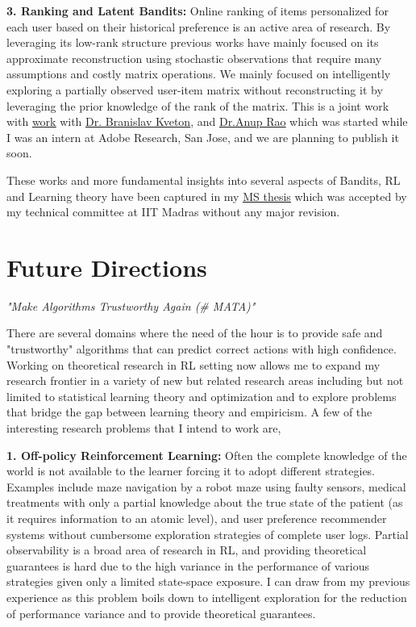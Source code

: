 \documentclass{article}
\begin{document}
\textbf{3. Ranking and Latent Bandits:} Online ranking of items personalized for each user based on their historical preference is an active area of research. By leveraging its low-rank structure previous works have mainly focused on its approximate reconstruction using stochastic observations that require many assumptions and costly matrix operations. We mainly focused on intelligently exploring a partially observed user-item matrix without reconstructing it by leveraging the prior knowledge of the rank of the matrix. This is a joint work with  \href{https://subhojyoti.github.io/pdf/paper.pdf}{\underline{\color{blue} work}} with \href{http://www.bkveton.com/}{\underline{\color{red}Dr. Branislav Kveton}}, and \href{https://sites.google.com/site/anupraob/}{\underline{\color{red}Dr.Anup Rao}} which was started while I was an intern at Adobe Research, San Jose, and we are planning to publish it soon.

These works and more fundamental insights into several aspects of Bandits, RL and Learning theory have been captured in my \href{https://www.cse.iitm.ac.in/~ravi/papers/Subhojyoti_thesis.pdf}{\underline{\color{blue}MS thesis}} which was accepted by my technical committee at IIT Madras without any major revision.
     
     
    
\vspace*{-2em}
\section{Future Directions}
\vspace*{-1em}

\begin{center} \textit{"Make Algorithms Trustworthy Again (\# MATA)"}\end{center}

There are several domains where the need of the hour is to provide safe and "trustworthy" algorithms that can predict correct actions with high confidence. Working on theoretical research in RL setting now allows me to expand my research frontier in a variety of new but related research areas including but not limited to statistical learning theory and optimization and to explore problems that bridge the gap between learning theory and empiricism. A few of the interesting research problems
that I intend to work are,

\textbf{1. Off-policy Reinforcement Learning:} Often the complete knowledge of the world is not available to the learner forcing it to adopt different strategies. Examples include maze navigation by a robot maze using faulty sensors, medical treatments with only a partial knowledge about the true state of the patient (as it requires information to
an atomic level), and user preference recommender systems without cumbersome exploration strategies of complete user logs. Partial observability is a broad area of research in RL, and providing theoretical guarantees is hard due to the high variance in the performance of various strategies given only a limited state-space exposure. I can draw from my previous experience as this problem boils down to intelligent exploration for the reduction of performance variance and to provide theoretical guarantees.
\end{document}
